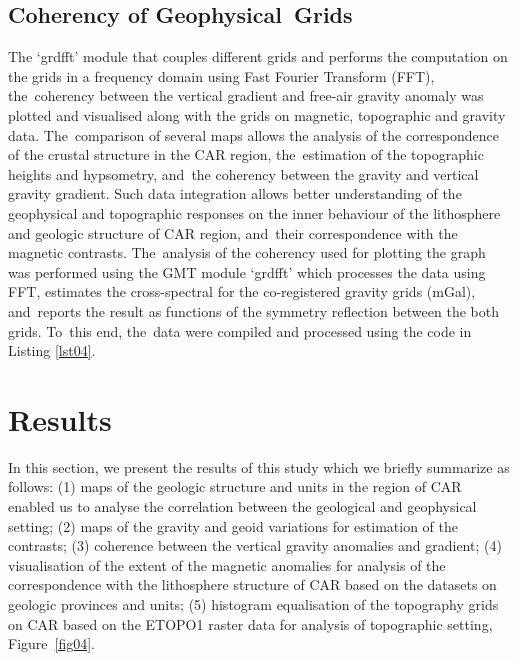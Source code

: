 \documentclass[minerals,article,accept,pdftex,moreauthors]{Definitions/mdpi}
\begin{document}
\subsection{Coherency of Geophysical~Grids}

The `grdfft' module that couples different grids and performs the computation on the grids in a frequency domain using Fast Fourier Transform (FFT), the~coherency between the vertical gradient and free-air gravity anomaly was plotted and visualised along with the grids on magnetic, topographic and gravity data. The~comparison of several maps allows the analysis of the correspondence of the crustal structure in the CAR region, the~estimation of the topographic heights and hypsometry, and~the coherency between the gravity and vertical gravity gradient. Such data integration allows better understanding of the geophysical and topographic responses on the inner behaviour of the lithosphere and geologic structure of CAR region, and~their correspondence with the magnetic contrasts. The~analysis of the coherency used for plotting the graph was performed using the GMT module `grdfft' which processes the data using FFT, %
estimates the cross-spectral for the co-registered gravity grids (mGal), and~reports the result as functions of the symmetry reflection between the both grids. To~this end, the~data were compiled and processed using the code in Listing \ref{lst04}. 

\section{Results}

In this section, we present the results of this study which we briefly summarize as follows: (1) %
maps of the geologic structure and units in the region of CAR enabled us to analyse the correlation between the geological and geophysical setting; (2) maps of {the gravity} and geoid variations for estimation of the contrasts; (3) coherence between the vertical gravity anomalies and gradient; (4) visualisation of the extent of the magnetic anomalies for analysis of the correspondence with the lithosphere structure of CAR based on the datasets on geologic provinces and units; (5) histogram equalisation of the topography grids on CAR based on the ETOPO1 raster data for analysis of topographic setting, Figure~\ref{fig04}.
\end{document}
